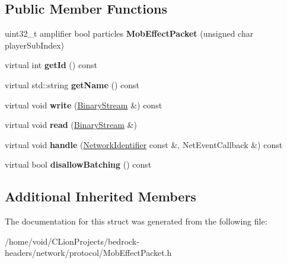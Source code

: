 \subsection*{Public Member Functions}
\begin{DoxyCompactItemize}
\item 
\mbox{\label{struct_mob_effect_packet_a97a563e1deaadad160f4d99cd86fae34}} 
uint32\+\_\+t amplifier bool particles {\bfseries Mob\+Effect\+Packet} (unsigned char player\+Sub\+Index)
\item 
\mbox{\label{struct_mob_effect_packet_aa0527038fd4ae94faac1fb1e1682eba5}} 
virtual int {\bfseries get\+Id} () const
\item 
\mbox{\label{struct_mob_effect_packet_a3736b9135fa1bc5ab0ad8caa843cd732}} 
virtual std\+::string {\bfseries get\+Name} () const
\item 
\mbox{\label{struct_mob_effect_packet_a7620929951a9da1bca7e2c6bb94516ee}} 
virtual void {\bfseries write} (\mbox{\hyperlink{struct_binary_stream}{Binary\+Stream}} \&) const
\item 
\mbox{\label{struct_mob_effect_packet_a90ac981f8b23fd28e3c9b6366e2bbf13}} 
virtual void {\bfseries read} (\mbox{\hyperlink{struct_binary_stream}{Binary\+Stream}} \&)
\item 
\mbox{\label{struct_mob_effect_packet_adc9f8c4fc77a30c6291d56beb17ad1cf}} 
virtual void {\bfseries handle} (\mbox{\hyperlink{struct_network_identifier}{Network\+Identifier}} const \&, Net\+Event\+Callback \&) const
\item 
\mbox{\label{struct_mob_effect_packet_a4b3ae328d918c391b5d1a63afd6b874f}} 
virtual bool {\bfseries disallow\+Batching} () const
\end{DoxyCompactItemize}
\subsection*{Additional Inherited Members}


The documentation for this struct was generated from the following file\+:\begin{DoxyCompactItemize}
\item 
/home/void/\+C\+Lion\+Projects/bedrock-\/headers/network/protocol/Mob\+Effect\+Packet.\+h\end{DoxyCompactItemize}
